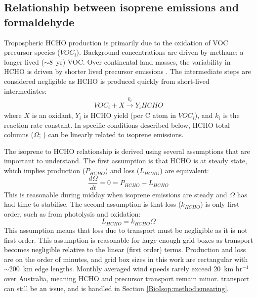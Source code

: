     
  \subsection{Relationship between isoprene emissions and formaldehyde}
    \label{BioIsop:method:slope}
    
    
    Tropospheric HCHO production is primarily due to the oxidation of VOC precursor species ($VOC_i$).
    Background concentrations are driven by methane; a longer lived ($\sim 8$~yr) VOC.
    Over continental land masses, the variability in HCHO is driven by shorter lived precursor emissions \parencite{Chance2000,Palmer2003}.
    The intermediate steps are considered negligible as HCHO is produced quickly from short-lived intermediates:
    \begin{eqnarray*}
      VOC_i + X \overset{k_i}{\rightarrow} Y_i HCHO
    \end{eqnarray*}
    where $X$ is an oxidant, $Y_i$ is HCHO yield (per C atom in $VOC_i$), and $k_i$ is the reaction rate constant.
    In specific conditions described below, HCHO total columns ($\Omega$; \moleccm) can be linearly related to isoprene emissions.
    
    The isoprene to HCHO relationship is derived using several assumptions that are important to understand.
    The first assumption is that HCHO is at steady state, which implies production ($P_{HCHO}$) and loss ($L_{HCHO}$) are equivalent:
    \begin{equation}
      \label{BioIsop:method:slope:eqn_steady_state]}
      \frac{d \Omega }{dt} = 0 = P_{HCHO} - L_{HCHO}
    \end{equation}
    This is reasonable during midday when isoprene emissions are steady and $\Omega$ has had time to stabilise.
    The second assumption is that loss ($k_{HCHO}$) is only first order, such as from photolysis and oxidation:
    \begin{equation}
      \label{BioIsop:method:slope:eqn_loss}
      L_{HCHO}  = k_{HCHO} \Omega %
    \end{equation}
    This assumption means that loss due to transport must be negligible as it is not first order.
    This assumption is reasonable for large enough grid boxes as transport becomes negligible relative to the linear (first order) terms.
    Production and loss are on the order of minutes, and grid box sizes in this work are rectangular with $\sim 200$~km edge lengths.
    Monthly averaged wind speeds rarely exceed 20~km hr$^{-1}$ over Australia, meaning HCHO and precursor transport remain minor.
    transport can still be an issue, and is handled in Section \ref{BioIsop:method:smearing}.
    
